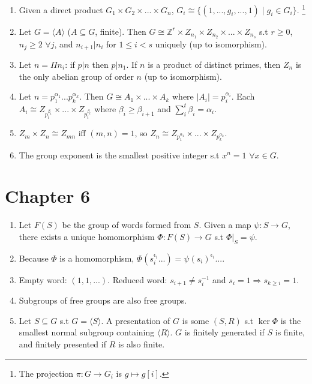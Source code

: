 \documentclass{article}
\begin{document}
\begin{enumerate}[1.]
    \item Given a direct product $G_1 \times G_2 \times ... \times G_n$,
        $G_i \cong \{(1, ..., g_i, ..., 1) \mid g_i \in G_i\}$.
        \footnote{The projection $\pi : G \rightarrow G_i$ is $g \mapsto
        g[i]$.}
    \item Let $G = \langle A \rangle$ ($A \subseteq G$, finite). Then $G \cong
        \mathbb{Z}^r \times Z_{n_1} \times Z_{n_2} \times ... \times
        Z_{n_s}$ s.t $r \geq 0$, $n_j \geq 2$ $\forall j$, and $n_{i+1} |
        n_i$ for $1 \leq i < s$ uniquely (up to isomorphism).
    \item Let $n = \Pi n_i$: if $p | n$ then $p | n_1$. If $n$ is a product
        of distinct primes, then $Z_n$ is the only abelian group of order
        $n$ (up to isomorphism).
    \item Let $n = p_1^{\alpha_1}...p_k^{\alpha_k}$. Then $G \cong A_1
        \times ... \times A_k$ where $|A_i| = p_i^{\alpha_i}$. Each $A_i
        \cong Z_{p_i^{\beta_1}} \times ... \times Z_{p_i^{\beta_t}}$ where
        $\beta_i \geq \beta_{i+1}$ and $\sum_i^t \beta_i = \alpha_i$.
    \item $Z_m \times Z_n \cong Z_{mn}$ iff $(m, n) = 1$, so $Z_n \cong
        Z_{p_1^{\alpha_1}} \times ... \times Z_{p_k^{\alpha_k}}$.
    \item The group exponent is the smallest positive integer s.t $x^n = 1$
        $\forall x \in G$.
\end{enumerate}

\section*{Chapter 6}

\begin{enumerate}[1.]
    \item Let $F(S)$ be the group of words formed from $S$.
        Given a map $\psi : S \rightarrow G$, there exists a unique
        homomorphism $\Phi : F(S) \rightarrow G$ s.t $\Phi|_S = \psi$.
    \item Because $\Phi$ is a homomorphism, $\Phi(s_i^{\epsilon_i} ...) =
        \psi(s_i)^{\epsilon_i} ...$.
    \item Empty word: $(1, 1, ...)$. Reduced word: $s_{i+1} \not= s_i^{-1}$
        and $s_i = 1 \Rightarrow s_{k \geq i} = 1$.
    \item Subgroups of free groups are also free groups.
    \item Let $S \subseteq G$ s.t $G = \langle S \rangle$. A presentation of
        $G$ is some $(S, R)$ s.t $\ker \Phi$ is the smallest normal subgroup
        containing $\langle R \rangle$. $G$ is finitely generated if $S$ is
        finite, and finitely presented if $R$ is also finite.
\end{enumerate}
\end{document}
